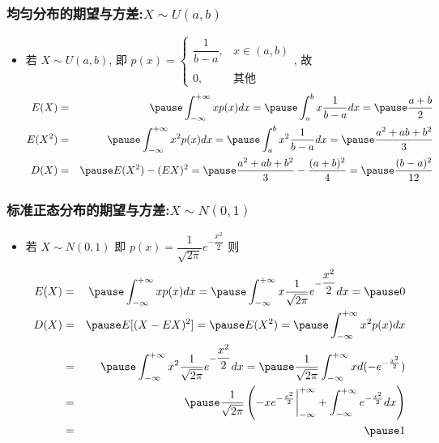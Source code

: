 	\begin{frame}
		\frametitle{均匀分布的期望与方差:$X\sim U (a,b)$}
		\begin{itemize}[<+-|alert@+>]
			\item 若 $X\sim U (a,b)$, 即 $p (x)=\left\{\begin{array}{ll}
				\dfrac{1}{b-a}, & x\in (a,b)\\
				\\
				0, & \mbox{其他}
			\end{array}\right.
			$, 故 \pause
			\begin{eqnarray*}
				E(X)&=&\pause \int_{-\infty}^{+\infty}xp(x)dx=\pause \int_a^bx\dfrac{1}{b-a}dx=\pause \dfrac{a+b}{2}\\
				E(X^2)&=&\pause \int_{-\infty}^{+\infty}x^2p(x)dx=\pause \int_a^bx^2\dfrac{1}{b-a}dx=\pause \dfrac{a^2+ab+b^2}{3}\\
				D(X)&=&\pause E(X^2)-(EX)^2=\pause \dfrac{a^2+ab+b^2}{3}-\dfrac{(a+b)^2}{4}=\pause \dfrac{(b-a)^2}{12}
			\end{eqnarray*}
		\end{itemize}
	\end{frame}
	\begin{frame}
		\frametitle{标准正态分布的期望与方差:$X\sim N (0,1)$}
		\begin{itemize}
			\item 若 $X\sim N (0,1)$ 即 $p (x)=\dfrac{1}{\sqrt{2\pi}} e^{-\dfrac{x^2}{2}}$ 则
			\begin{eqnarray*}
				E(X)&=&\pause \int_{-\infty}^{+\infty}xp(x)dx=\pause \int_{-\infty}^{+\infty}x\dfrac{1}{\sqrt{2\pi}}e^{-\dfrac{x^2}{2}}dx=\pause 0\\
				D(X)&=&\pause E[(X-EX)^2]=\pause E(X^2)=\pause \int_{-\infty}^{+\infty}x^2p(x)dx\\
				&=&\pause \int_{-\infty}^{+\infty}x^2\dfrac{1}{\sqrt{2\pi}}e^{-\dfrac{x^2}{2}}dx=\pause \dfrac{1}{\sqrt{2\pi}}\int_{-\infty}^{+\infty}xd(-e^{-\frac{x^2}{2}})\\
				&=&\pause\dfrac{1}{\sqrt{2\pi}}\left(-xe^{-\frac{x^2}{2}}\bigg|_{-\infty}^{+\infty}+\int_{-\infty}^{+\infty}e^{-\frac{x^2}{2}}dx\right)\\
				&=&\pause 1
			\end{eqnarray*}

		\end{itemize}
	\end{frame}
